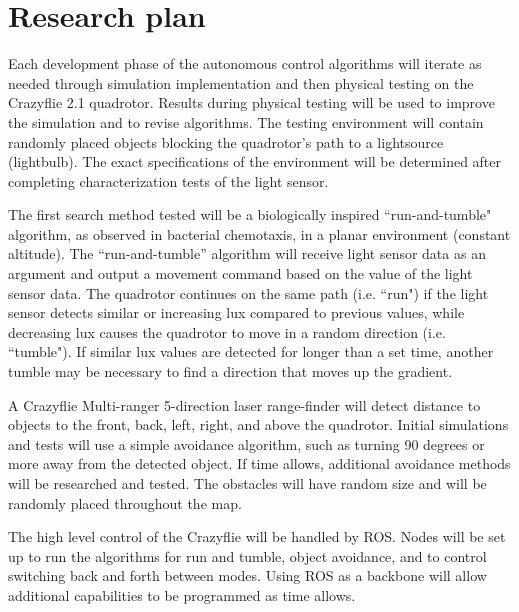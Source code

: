 \documentclass{article}
\begin{document}
\section*{Research plan}
Each development phase of the autonomous control algorithms will iterate as needed through simulation implementation and then physical testing on the Crazyflie 2.1 quadrotor. Results during physical testing will be used to improve the simulation and to revise algorithms. The testing environment will contain randomly placed objects blocking the quadrotor's path to a lightsource (lightbulb). The exact specifications of the environment will be determined after completing characterization tests of the light sensor.
\par
The first search method tested will be a biologically inspired ``run-and-tumble" algorithm, as observed in bacterial chemotaxis, in a planar environment (constant altitude). The ``run-and-tumble'' algorithm will receive light sensor data as an argument and output a movement command based on the value of the light sensor data. The quadrotor continues on the same path (i.e. ``run") if the light sensor detects similar or increasing lux compared to previous values, while decreasing lux causes the quadrotor to move in a random direction (i.e. ``tumble"). If similar lux values are detected for longer than a set time, another tumble may be necessary to find a direction that moves up the gradient.
 \par
A Crazyflie Multi-ranger 5-direction laser range-finder will detect distance to objects to the front, back, left, right, and above the quadrotor. Initial simulations and tests will use a simple avoidance algorithm, such as turning 90 degrees or more away from the detected object. If time allows, additional avoidance methods will be researched and tested. The obstacles will have random size and will be randomly placed throughout the map. 
\par
The high level control of the Crazyflie will be handled by ROS. Nodes will be set up to run the algorithms for run and tumble, object avoidance, and to control switching back and forth between modes. Using ROS as a backbone will allow additional capabilities to be programmed as time allows.
\end{document}
